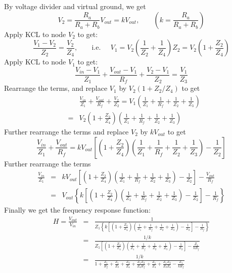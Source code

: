 \begin{itemize}
  By voltage divider and virtual ground, we get
  \[
  V_2=\frac{R_a}{R_a+R_b}V_{out}=kV_{out},\;\;\;\;\;\;\;\left(k=\frac{R_a}{R_a+R_b}\right)
  \]
  Apply KCL to node $V_2$ to get:
  \[
  \frac{V_1-V_2}{Z_2}=\frac{V_2}{Z_4},\;\;\;\;\;\;\;\mbox{i.e.}\;\;\;\;\;
  V_1=V_2\left(\frac{1}{Z_2}+\frac{1}{Z_4}\right)Z_2
  =V_2\left(1+\frac{Z_2}{Z_4}\right)
  \]
  Apply KCL to node $V_1$ to get:
  \[
  \frac{V_{in}-V_1}{Z_1}+\frac{V_{out}-V_1}{R_f}+\frac{V_2-V_1}{Z_2}
  =\frac{V_1}{Z_3}
  \]
  Rearrange the terms, and replace $V_1$ by $V_2(1+Z_2/Z_4)$ to get
  \begin{eqnarray}
    &&\frac{V_{in}}{Z_1}+\frac{V_{out}}{R_f}+\frac{V_2}{Z_2}
    =V_1\left(\frac{1}{Z_1}+\frac{1}{R_f}+\frac{1}{Z_2}+\frac{1}{Z_3}\right)
    \nonumber\\
    &=&V_2\left(1+\frac{Z_2}{Z_4}\right)\left(\frac{1}{Z_1}
    +\frac{1}{R_f}+\frac{1}{Z_2}+\frac{1}{Z_3}\right)
    \nonumber
  \end{eqnarray}
  Further rearrange the terms and replace $V_2$ by $kV_{out}$ to get
  \[
  \frac{V_{in}}{Z_1}+\frac{V_{out}}{R_f}
  =kV_{out}\left[\left(1+\frac{Z_2}{Z_4}\right)\left(\frac{1}{Z_1}+\frac{1}{R_f}
    +\frac{1}{Z_2}+\frac{1}{Z_3}\right)-\frac{1}{Z_2}\right]
  \]
  Further rearrange the terms
  \begin{eqnarray}
    \frac{V_{in}}{Z_1}&=&kV_{out}\left[\left(1+\frac{Z_2}{Z_4}\right)
\left(\frac{1}{Z_1}
      +\frac{1}{R_f}+\frac{1}{Z_2}+\frac{1}{Z_3}\right)-\frac{1}{Z_2}\right]-\frac{V_{out}}{R_f}
    \nonumber \\
    &=&
    V_{out}\left\{k\left[\left(1+\frac{Z_2}{Z_4}\right)\left(\frac{1}{Z_1}
      +\frac{1}{R_f}+\frac{1}{Z_2}+\frac{1}{Z_3}\right)-\frac{1}{Z_2}\right]-\frac{1}{R_f}\right\}
    \nonumber 
  \end{eqnarray}
  Finally we get the frequency response function:
  \begin{eqnarray}
    H=\frac{V_{out}}{V_{in}}&=&
    \frac{1}{Z_1\left\{k\left[\left(1+\frac{Z_2}{Z_4}\right)\left(\frac{1}{Z_1}+\frac{1}{R_f}+\frac{1}{Z_2}+\frac{1}{Z_3}\right)-\frac{1}{Z_2}\right]-\frac{1}{R_f}\right\}}
    \nonumber \\
    &=&
    \frac{1/k}{Z_1\left[\left(1+\frac{Z_2}{Z_4}\right)\left(\frac{1}{Z_1}+\frac{1}{R_f}+\frac{1}{Z_2}+\frac{1}{Z_3}\right)-\frac{1}{Z_2}\right]-\frac{Z_1}{kR_f}}
    \nonumber \\
    &=&
    \frac{1/k}{1+\frac{Z_1}{R_f}+\frac{Z_1}{Z_3}+\frac{Z_2}{Z_4}+\frac{Z_1Z_2}{Z_4R_f}+\frac{Z_1}{Z_4}+\frac{Z_1Z_2}{Z_3Z_4}-\frac{Z_1}{kR_f}}
    \nonumber

\end{eqnarray}
\end{itemize}
